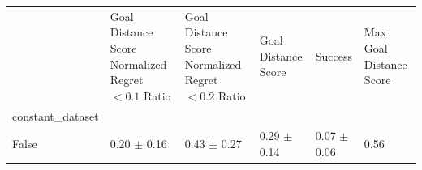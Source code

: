\begin{tabular}{llllll}
\toprule
 & Goal Distance Score Normalized Regret $< 0.1$ Ratio & Goal Distance Score Normalized Regret $< 0.2$ Ratio & Goal Distance Score & Success & Max Goal Distance Score \\
constant_dataset &  &  &  &  &  \\
\midrule
False & 0.20 $\pm$ 0.16 & 0.43 $\pm$ 0.27 & 0.29 $\pm$ 0.14 & 0.07 $\pm$ 0.06 & 0.56 \\
\bottomrule
\end{tabular}
